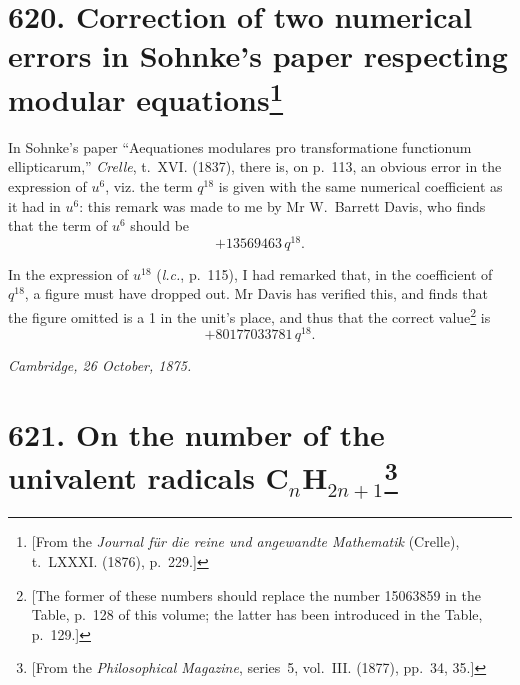 \documentclass[11pt,a4paper]{book}
\begin{document}
\newpage
\section[Correction of two numerical errors in Sohnke's paper respecting modular equations]{\textbf{620.} Correction of two numerical errors in Sohnke's paper respecting modular equations\footnote{[From the \textit{Journal f\"{u}r die reine und angewandte Mathematik} (Crelle), t.~LXXXI. (1876), p.~229.]}}

In Sohnke's paper ``Aequationes modulares pro transformatione functionum ellipticarum,'' \textit{Crelle}, t.~XVI. (1837), there is, on p.~113, an obvious error in the expression of $u^6$, viz. the term $q^{18}$ is given with the same numerical coefficient as it had in $u^6$: this remark was made to me by Mr W.~Barrett Davis, who finds that the term of $u^6$ should be
\[
+ 13569463\, q^{18}.
\]

In the expression of $u^{18}$ (\textit{l.c.}, p.~115), I had remarked that, in the coefficient of $q^{18}$, a figure must have dropped out. Mr Davis has verified this, and finds that the figure omitted is a 1 in the unit's place, and thus that the correct value\footnote{[The former of these numbers should replace the number 15063859 in the Table, p.~128 of this volume; the latter has been introduced in the Table, p.~129.]} is
\[
+ 80177033781\, q^{18}.
\]

\begin{flushright}
\textit{Cambridge, 26 October, 1875.}
\end{flushright}

\newpage
\section[On the number of the univalent radicals $\mathrm{C}_n\mathrm{H}_{2n+1}$]{\textbf{621.} On the number of the univalent radicals C$_n$H$_{2n+1}$\footnote{[From the \textit{Philosophical Magazine}, series~5, vol.~III. (1877), pp.~34, 35.]}}
\end{document}

